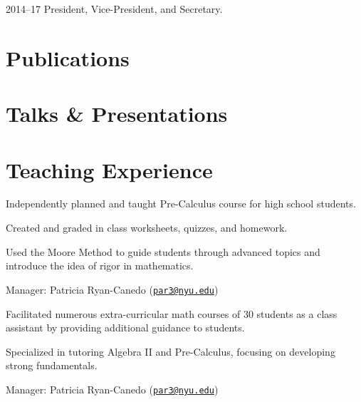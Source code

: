 \documentclass{cultvoucher}
\begin{document}

         {2014--17}
         {President, Vice-President, and Secretary.}
\vspace{-2\topsep}


\section{Publications}



\section{Talks \& Presentations}

\vspace{-2\topsep}


\section{Teaching Experience}
\begin{tightitemize}
    \item Independently planned and taught Pre-Calculus course for high school
          students.
    \item Created and graded in class worksheets, quizzes, and homework.
    \item Used the Moore Method to guide students through advanced topics and
          introduce the idea of rigor in mathematics.
    \item Manager: Patricia Ryan-Canedo (\href{mailto:par3@nyu.edu}{\texttt{par3@nyu.edu}})
\end{tightitemize}
\vspace{\topsep}

\begin{tightitemize}
    \item Facilitated numerous extra-curricular math courses of 30 students as
          a class assistant by providing additional guidance to students.
    \item Specialized in tutoring Algebra II and Pre-Calculus, focusing on
          developing strong fundamentals.
    \item Manager: Patricia Ryan-Canedo (\href{mailto:par3@nyu.edu}{\texttt{par3@nyu.edu}})
\end{tightitemize}
\end{document}
